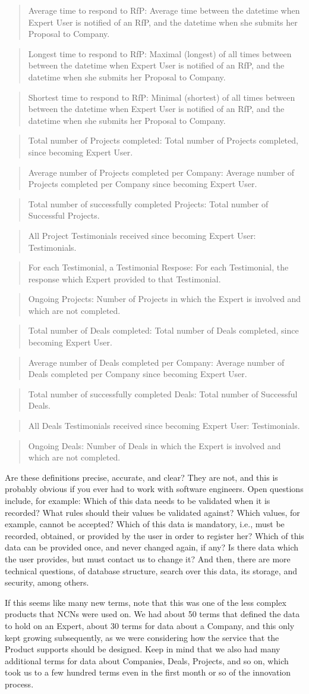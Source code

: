 \documentclass[graybox,envcountchap,sectrefs]{svmono}
\newcommand{\ncn}{NCN}
\newcommand{\newterm}[1]{\begin{quote}\textsf{#1}\end{quote}}
\newcommand{\nterm}[1]{\textsf{#1}}
\begin{document}
\newterm{Average time to respond to RfP: Average time between the datetime when Expert User is notified of an RfP, and the datetime when she submits her Proposal to Company.}
\newterm{Longest time to respond to RfP: Maximal (longest) of all times between between the datetime when Expert User is notified of an RfP, and the datetime when she submits her Proposal to Company.}
\newterm{Shortest time to respond to RfP: Minimal (shortest) of all times between between the datetime when Expert User is notified of an RfP, and the datetime when she submits her Proposal to Company.}
\newterm{Total number of Projects completed: Total number of Projects completed, since becoming Expert User.}
\newterm{Average number of Projects completed per Company: Average number of Projects completed per Company since becoming Expert User.}
\newterm{Total number of successfully completed Projects: Total number of Successful Projects.}
\newterm{All Project Testimonials received since becoming Expert User: Testimonials.}
\newterm{For each Testimonial, a Testimonial Respose: For each Testimonial, the response which Expert provided to that Testimonial.}
\newterm{Ongoing Projects: Number of Projects in which the Expert is involved and which are not completed.}
\newterm{Total number of Deals completed: Total number of Deals completed, since becoming Expert User.}
\newterm{Average number of Deals completed per Company: Average number of Deals completed per Company since becoming Expert User.}
\newterm{Total number of successfully completed Deals: Total number of Successful Deals.}
\newterm{All Deals Testimonials received since becoming Expert User: Testimonials.}
\newterm{Ongoing Deals: Number of Deals in which the Expert is involved and which are not completed.}

Are these definitions precise, accurate, and clear? They are not, and this is probably obvious if you ever had to work with software engineers. Open questions include, for example: Which of this data needs to be validated when it is recorded? What rules should their values be validated against? Which values, for example, cannot be accepted? Which of this data is mandatory, i.e., must be recorded, obtained, or provided by the user in order to register her? Which of this data can be provided once, and never changed again, if any? Is there data which the user provides, but must contact us to change it? And then, there are more technical questions, of database structure, search over this data, its storage, and security, among others. 

If this seems like many new terms, note that this was one of the less complex products that \ncn s were used on. We had about 50 terms that defined the data to hold on an \nterm{Expert}, about 30 terms for data about a \nterm{Company}, and this only kept growing subsequently, as we were considering how the service that the \nterm{Product} supports should be designed. Keep in mind that we also had many additional terms for data about \nterm{Companies}, \nterm{Deals}, \nterm{Projects}, and so on, which took us to a few hundred terms even in the first month or so of the innovation process.
\end{document}
